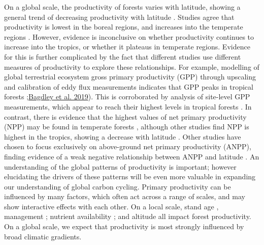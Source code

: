 \documentclass[]{article}
\begin{document}
On a global scale, the productivity of forests varies with latitude,
showing a general trend of decreasing productivity with latitude
\citep{beer_terrestrial_2010, jung_global_2011}. Studies agree that
productivity is lowest in the boreal regions, and increases into the
temperate regions
\citep{luyssaert_co_2007, huston_global_2009, beer_terrestrial_2010, jung_global_2011}.
However, evidence is inconclusive on whether productivity continues to
increase into the tropics, or whether it plateaus in temperate regions.
Evidence for this is further complicated by the fact that different
studies use different measures of productivity to explore these
relationships. For example, modelling of global terrestrial ecosystem
gross primary productivity (GPP) through upscaling and calibration of
eddy flux measurements indicates that GPP peaks in tropical forests
\citep{beer_terrestrial_2010, jung_global_2011};\href{https://onlinelibrary.wiley.com/doi/epdf/10.1111/gcb.14729}{Bagdley
et al. 2019}). This is corroborated by analysis of site-level GPP
measurements, which appear to reach their highest levels in tropical
forests \citep{luyssaert_co_2007}. In contrast, there is evidence that
the highest values of net primary productivity (NPP) may be found in
temperate forests \citep{luyssaert_co_2007, huston_global_2009},
although other studies find NPP is highest in the tropics, showing a
decrease with latitude \citep{simova_enigma_2017}. Other studies have
chosen to focus exclusively on above-ground net primary productivity
(ANPP), finding evidence of a weak negative relationship between ANPP
and latitude \citep{huston_global_2009, gillman_latitude_2015}. An
understanding of the global patterns of productivity is important;
however elucidating the drivers of these patterns will be even more
valuable in expanding our understanding of global carbon cycling.
Primary productivity can be influenced by many factors, which often act
across a range of scales, and may show interactive effects with each
other. On a local scale, stand age
\citep{litton_carbon_2007, gillman_latitude_2015}, management
\citep{simova_enigma_2017}; nutrient availability
\citep{aragao_above-_2009}; and altitude
\citep{girardin_net_2010, malhi_variation_2017} all impact forest
productivity. On a global scale, we expect that productivity is most
strongly influenced by broad climatic gradients.
\end{document}
